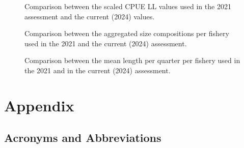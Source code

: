 \documentclass[
]{scrartcl}
\begin{document}
\newpage{}

\begin{figure}


\caption{\label{fig-comp-cpue}Comparison between the scaled CPUE LL
values used in the 2021 assessment and the current (2024) values.}

\end{figure}%

\newpage{}

\begin{figure}


\caption{\label{fig-comp-agg-size}Comparison between the aggregated size
compositions per fishery used in the 2021 and the current (2024)
assessment.}

\end{figure}%

\newpage{}

\begin{figure}


\caption{\label{fig-comp-mlen}Comparison between the mean length per
quarter per fishery used in the 2021 and in the current (2024)
assessment.}

\end{figure}%

\newpage{}

\section{Appendix}\label{appendix}

\subsection{Acronyms and
Abbreviations}\label{acronyms-and-abbreviations}
\end{document}
